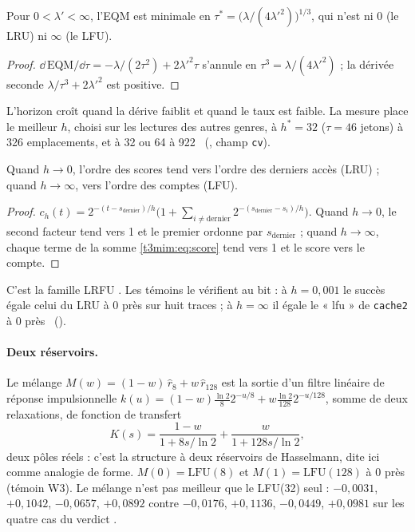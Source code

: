 \begin{proposition}\label{t3mim:prop:horizon}
Pour $0 < \lambda' < \infty$, l'EQM est minimale en $\tau^\ast = \bigl(\lambda/(4\lambda'^2)\bigr)^{1/3}$, qui n'est ni $0$ (le LRU) ni $\infty$ (le LFU).
\end{proposition}
\begin{proof}
$\dd\,\mathrm{EQM}/\dd\tau = -\lambda/(2\tau^2) + 2\lambda'^2\tau$ s'annule en $\tau^3 = \lambda/(4\lambda'^2)$ ; la dérivée seconde $\lambda/\tau^3 + 2\lambda'^2$ est positive.
\end{proof}
L'horizon croît quand la dérive faiblit et quand le taux est faible. La mesure place le meilleur $h$, choisi sur les lectures des autres genres, à $h^\ast = 32$ ($\tau = 46$ jetons) à 326 emplacements, et à 32 ou 64 à 922 \mes~(, champ \texttt{cv}).

\begin{proposition}\label{t3mim:prop:continuum}
Quand $h \to 0$, l'ordre des scores tend vers l'ordre des derniers accès (LRU) ; quand $h \to \infty$, vers l'ordre des comptes (LFU).
\end{proposition}
\begin{proof}
$c_h(t) = 2^{-(t - s_{\text{dernier}})/h}\bigl(1 + \sum_{i \ne \text{dernier}} 2^{-(s_{\text{dernier}} - s_i)/h}\bigr)$. Quand $h \to 0$, le second facteur tend vers 1 et le premier ordonne par $s_{\text{dernier}}$ ; quand $h \to \infty$, chaque terme de la somme \eqref{t3mim:eq:score} tend vers 1 et le score vers le compte.
\end{proof}
C'est la famille LRFU \cite{lee2001lrfu}. Les témoins le vérifient au bit : à $h = 0{,}001$ le succès égale celui du LRU à 0 près sur huit traces ; à $h = \infty$ il égale le « lfu » de \texttt{cache2} à 0 près \mes~().

\paragraph{Deux réservoirs.} Le mélange $M(w) = (1-w)\,\hat r_8 + w\,\hat r_{128}$ est la sortie d'un filtre linéaire de réponse impulsionnelle $k(u) = (1-w)\tfrac{\ln 2}{8}2^{-u/8} + w\tfrac{\ln 2}{128}2^{-u/128}$, somme de deux relaxations, de fonction de transfert
\begin{equation}\label{t3mim:eq:transfert}
K(s) = \frac{1-w}{1 + 8s/\ln 2} + \frac{w}{1 + 128 s/\ln 2},
\end{equation}
deux pôles réels : c'est la structure à deux réservoirs de Hasselmann, dite ici comme analogie de forme. $M(0) = \mathrm{LFU}(8)$ et $M(1) = \mathrm{LFU}(128)$ à 0 près (témoin W3). Le mélange n'est pas meilleur que le LFU(32) seul : $-0{,}0031$, $+0{,}1042$, $-0{,}0657$, $+0{,}0892$ contre $-0{,}0176$, $+0{,}1136$, $-0{,}0449$, $+0{,}0981$ sur les quatre cas du verdict \mes.

